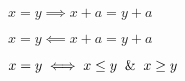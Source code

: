 \documentclass[nofonts]{ctexart}
\begin{document}
$ x=y \implies x+a=y+a $

$ x=y \impliedby x+a=y+a $

$ x=y \iff x \le y \And x \ge y $
\end{document}

